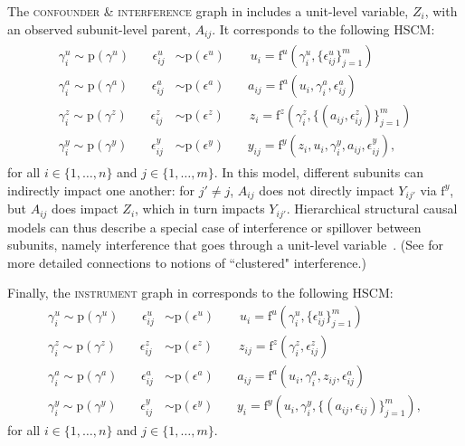 \documentclass[12pt]{article}
\newcommand{\pr}{\mathrm{p}}
\newcommand{\f}{\mathrm{f}}
\begin{document}
The \textsc{confounder \& interference} graph in  includes a unit-level variable, $Z_{i}$, with an observed subunit-level parent, $A_{ij}$. It corresponds to the following HSCM:
\begin{align} \label{eqn:ex-hscm-interfere}
\begin{split}
\gamma_i^{u} \sim \pr(\gamma^{u}) \,\,\,\,\,\,\,\,\,\,\,\epsilon_{ij}^{u} &\sim \pr(\epsilon^{u})\,\,\,\,\,\,\,\,\,\,\,\,u_i = \f^u(\gamma_i^{u}, \{\epsilon_{ij}^u\}_{j=1}^m)\\
\gamma_i^{a} \sim \pr(\gamma^{a}) \,\,\,\,\,\,\,\,\,\,\,\epsilon_{ij}^{a} &\sim \pr(\epsilon^{a}) \,\,\,\,\,\,\,\,\,\,\, a_{ij} = \f^a(u_i, \gamma^{a}_i, \epsilon_{ij}^{a})\\
\gamma_i^{z} \sim \pr(\gamma^{z}) \,\,\,\,\,\,\,\,\,\,\,\epsilon_{ij}^{z} &\sim \pr(\epsilon^{z}) \,\,\,\,\,\,\,\,\,\,\,\, z_i = \f^z(\gamma_i^{z}, \{(a_{ij}, \epsilon_{ij}^{z})\}_{j=1}^m)\\
\gamma_i^{y} \sim \pr(\gamma^{y}) \,\,\,\,\,\,\,\,\,\,\, \epsilon_{ij}^{y} &\sim \pr(\epsilon^{y}) \,\,\,\,\,\,\,\,\,\,\, y_{ij} = \f^y(z_i, u_i, \gamma_i^{y}, a_{ij}, \epsilon_{ij}^{y}),
\end{split}
\end{align}
for all $i \in \{1, \ldots, n\}$ and $j \in \{1, \ldots, m\}$.  In this model, different subunits can indirectly impact one another: for $j' \neq j$, $A_{ij}$ does not directly impact $Y_{ij'}$ via $\f^y$, but $A_{ij}$ does impact $Z_i$, which in turn impacts $Y_{ij'}$.  Hierarchical structural causal models can thus describe a special case of interference or spillover between subunits, namely interference that goes through a unit-level variable~\citep{Hudgens2008-hn,Tchetgen_Tchetgen2012-lm}.
(See  for more detailed connections to notions of ``clustered" interference.)

Finally, the \textsc{instrument} graph in  corresponds to the following HSCM:
\begin{equation} \label{eqn:ex-hscm-instrument}
\begin{split}
\gamma_i^{u} \sim \pr(\gamma^{u}) \,\,\,\,\,\,\,\,\,\,\,\epsilon_{ij}^{u} &\sim \pr(\epsilon^{u})\,\,\,\,\,\,\,\,\,\,\,\,u_i = \f^u(\gamma_i^{u}, \{\epsilon_{ij}^u\}_{j=1}^m)\\
\gamma_i^{z} \sim \pr(\gamma^{z}) \,\,\,\,\,\,\,\,\,\,\,\epsilon_{ij}^{z} &\sim \pr(\epsilon^{z}) \,\,\,\,\,\,\,\,\,\,\,\, z_{ij} = \f^z(\gamma^{z}_i, \epsilon_{ij}^{z})\\
\gamma_i^{a} \sim \pr(\gamma^{a}) \,\,\,\,\,\,\,\,\,\,\,\epsilon_{ij}^{a} &\sim \pr(\epsilon^{a}) \,\,\,\,\,\,\,\,\,\,\,  a_{ij} = \f^a(u_i, \gamma^{a}_i, z_{ij}, \epsilon_{ij}^{a})\\
\gamma_i^{y} \sim \pr(\gamma^{y}) \,\,\,\,\,\,\,\,\,\,\, \epsilon_{ij}^{y} &\sim \pr(\epsilon^{y}) \,\,\,\,\,\,\,\,\,\,\, y_i = \f^y(u_i, \gamma_i^{y}, \{(a_{ij}, \epsilon_{ij})\}_{j=1}^m),
\end{split}
\end{equation}
for all $i \in \{1, \ldots, n\}$ and $j \in \{1, \ldots, m\}$.
\end{document}
